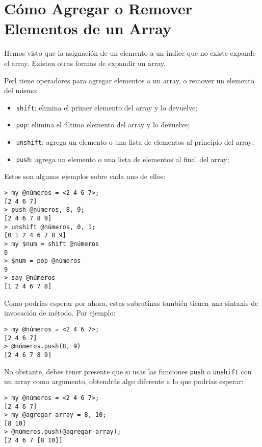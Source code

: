 \section{Cómo Agregar o Remover Elementos de un Array}

Hemos visto que la asignación de un elemento a un índice 
que no existe expande el array. Existen otras formas de expandir
un array.

Perl tiene operadores para agregar elementos a un array, o remover
un elemento del mismo:

\begin{itemize}
\item {\tt shift}: elimina el primer elemento del array y lo devuelve;
\item {\tt pop}: elimina el último elemento del array y lo devuelve;
\item {\tt unshift}: agrega un elemento o una lista de elementos al principio 
del array;
\item {\tt push}: agrega un elemento o una lista de elementos al final 
del array;
\end{itemize}

Estos son algunos ejemplos sobre cada uno de ellos:

\begin{verbatim}
> my @números = <2 4 6 7>;
[2 4 6 7]
> push @números, 8, 9;
[2 4 6 7 8 9]
> unshift @números, 0, 1;
[0 1 2 4 6 7 8 9]
> my $num = shift @números
0
> $num = pop @números
9
> say @números
[1 2 4 6 7 8]
\end{verbatim}

Como podrías esperar por ahora, estas subrutinas también
tienen una sintaxis de invocación de método. Por ejemplo:

\begin{verbatim}
> my @números = <2 4 6 7>;
[2 4 6 7]
> @números.push(8, 9)
[2 4 6 7 8 9]
\end{verbatim}

No obstante, debes tener presente que si usas las funciones
{\tt push} o {\tt unshift} con un array como argumento, 
obtendrás algo diferente a lo que podrías esperar:

\begin{verbatim}
> my @números = <2 4 6 7>;
[2 4 6 7]
> my @agregar-array = 8, 10;
[8 10]
> @números.push(@agregar-array);
[2 4 6 7 [8 10]]
\end{verbatim}

